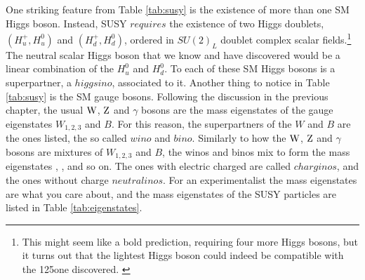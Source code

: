 One striking feature from Table \ref{tab:susy} is the existence of more than one SM Higgs boson. 
Instead, SUSY $requires$ the existence of two Higgs doublets, $(H^{+}_{u},H^{0}_{u})$ and $(H^{+}_{d},H^{0}_{d})$, ordered in $SU(2)_{L}$ doublet complex scalar fields.\footnote{This might seem like a bold prediction, requiring four more Higgs bosons, but it turns out that the lightest Higgs boson could indeed be compatible with the 125\GeV one discovered. \cite{Ellis:1638463}}
The neutral scalar Higgs boson that we know and have discovered would be a linear combination of the $H^{0}_{u}$ and $H^{0}_{d}$.  
To each of these SM Higgs bosons is a superpartner, a $higgsino$, associated to it. 
Another thing to notice in Table \ref{tab:susy} is the SM gauge bosons. 
Following the discussion in the previous chapter, the usual $\mathrm{W}$, $\mathrm{Z}$ and $\gamma$ bosons are the mass eigenstates of the gauge eigenstates $W_{1,2,3}$ and $B$. 
For this reason, the superpartners of the $W$ and $B$ are the ones listed, the so called $wino$ and $bino$. 
Similarly to how the $\mathrm{W}$, $\mathrm{Z}$ and $\gamma$ bosons are mixtures of $W_{1,2,3}$ and $B$, the winos and binos mix to form the mass eigenstates \firstcharg, \secondcharg\firstchi, \secondchi and so on. 
The ones with electric charged are called $charginos$, and the ones without charge $neutralinos$.   
For an experimentalist the mass eigenstates are what you care about, and the mass eigenstates of the SUSY particles are listed in Table \ref{tab:eigenstates}.  
